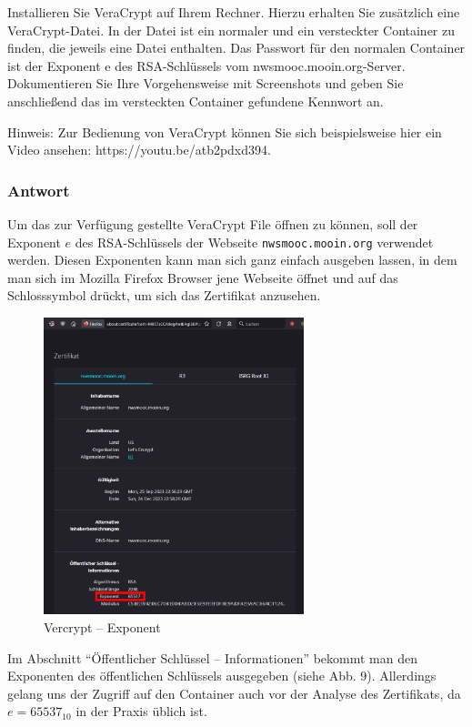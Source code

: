 \documentclass{article}
\begin{document}
Installieren Sie VeraCrypt  auf Ihrem Rechner. Hierzu erhalten Sie zusätzlich eine 
VeraCrypt-Datei. In der Datei ist ein normaler und ein versteckter Container 
zu finden, die jeweils eine Datei enthalten. Das Passwort für den normalen 
Container ist der Exponent e des RSA-Schlüssels vom nwsmooc.mooin.org-Server. 
Dokumentieren Sie Ihre Vorgehensweise mit Screenshots und geben Sie 
anschließend das im versteckten Container gefundene Kennwort an.

Hinweis: Zur Bedienung von VeraCrypt können Sie sich beispielsweise hier ein Video 
ansehen: https://youtu.be/atb2pdxd394.

\subsubsection*{Antwort}

Um das zur Verfügung gestellte VeraCrypt File öffnen zu können, soll der Exponent 
$e$ des RSA-Schlüssels der Webseite \texttt{nwsmooc.mooin.org} verwendet werden. 
Diesen Exponenten kann man sich ganz einfach ausgeben lassen, in dem man sich im 
Mozilla Firefox Browser jene Webseite öffnet und auf das Schlosssymbol drückt, um 
sich das Zertifikat anzusehen.

\begin{figure}[H]
	\includegraphics[width=0.675\textwidth]{images/09}
	\centering
	\caption{Vercrypt – Exponent}
\end{figure}

Im Abschnitt ``Öffentlicher Schlüssel – Informationen'' bekommt man den Exponenten 
des öffentlichen Schlüssels ausgegeben (siehe Abb. 9). Allerdings gelang uns der 
Zugriff auf den Container auch vor der Analyse des Zertifikats, da $e = 65537_{10}$ 
in der Praxis üblich ist.
\end{document}

